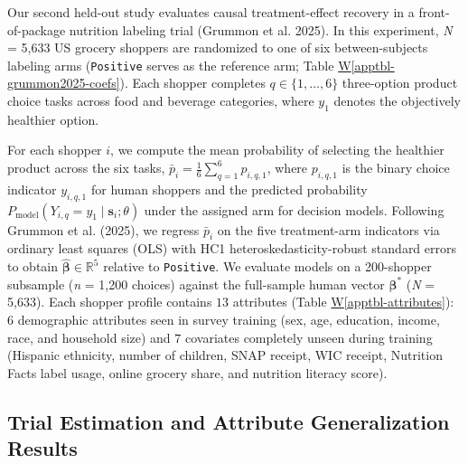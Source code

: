 \documentclass[
  11pt,
  letterpaper,
]{article}
\newcommand*\quartoapptblref[1]{Table \hyperref[#1]{W\ref{#1}}}
\begin{document}
Our second held-out study evaluates causal treatment-effect recovery in
a front-of-package nutrition labeling trial (Grummon et al. 2025). In
this experiment, \emph{N} = 5,633 US grocery shoppers are randomized to
one of six between-subjects labeling arms (\texttt{Positive} serves as
the reference arm; \quartoapptblref{apptbl-grummon2025-coefs}). Each
shopper completes \(q \in \{1, \dots, 6\}\) three-option product choice
tasks across food and beverage categories, where \(y_1\) denotes the
objectively healthier option.

For each shopper \(i\), we compute the mean probability of selecting the
healthier product across the six tasks,
\(\bar{p}_i = \frac{1}{6} \sum_{q=1}^6 p_{i,q,1}\), where \(p_{i,q,1}\)
is the binary choice indicator \(y_{i,q,1}\) for human shoppers and the
predicted probability
\(P_{\mathrm{model}}(Y_{i,q} = y_1 \mid \mathbf{s}_i; \theta)\) under
the assigned arm for decision models. Following Grummon et al. (2025),
we regress \(\bar{p}_i\) on the five treatment-arm indicators via
ordinary least squares (OLS) with HC1 heteroskedasticity-robust standard
errors to obtain \(\hat{\boldsymbol{\beta}} \in \mathbb{R}^5\) relative
to \texttt{Positive}. We evaluate models on a 200-shopper subsample
(\emph{n} = 1,200 choices) against the full-sample human vector
\(\boldsymbol{\beta}^*\) (\emph{N} = 5,633). Each shopper profile
contains \(13\) attributes (\quartoapptblref{apptbl-attributes}): \(6\)
demographic attributes seen in survey training (sex, age, education,
income, race, and household size) and \(7\) covariates completely unseen
during training (Hispanic ethnicity, number of children, SNAP receipt,
WIC receipt, Nutrition Facts label usage, online grocery share, and
nutrition literacy score).

\subsection{Trial Estimation and Attribute Generalization
Results}\label{trial-estimation-and-attribute-generalization-results}
\end{document}
